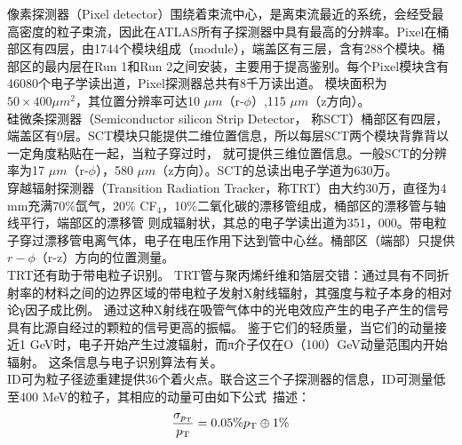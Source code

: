 像素探测器（Pixel detector）围绕着束流中心，是离束流最近的系统，会经受最高密度的粒子束流，因此在ATLAS所有子探测器中具有最高的分辨率。Pixel在桶部区有四层，由1744个模块组成（module），端盖区有三层，含有288个模块。桶部区的最内层在Run 1和Run 2之间安装，主要用于提高\bjet 鉴别。每个Pixel模块含有46080个电子学读出道，Pixel探测器总共有8千万读出道。
模块面积为$50\times400 \mu m^{2}$，其位置分辨率可达10 $\mu m$（r-$\phi$）,115 $\mu m$（z方向）。\\
硅微条探测器（Semiconductor silicon Strip Detector， 称SCT）桶部区有四层，端盖区有9层。SCT模块只能提供二维位置信息，所以每层SCT两个模块背靠背以一定角度粘贴在一起，当粒子穿过时，
就可提供三维位置信息。一般SCT的分辨率为17 $\mu m$（r-$\phi$），580 $\mu m$（z方向）。SCT的总读出电子学道为630万。\\
穿越辐射探测器（Transition Radiation Tracker，称TRT）由大约30万，直径为4 mm充满70\%氙气，20\% CF$_4$，10\%二氧化碳的漂移管组成，桶部区的漂移管与轴线平行，端部区的漂移管
则成辐射状，其总的电子学读出道为351，000。带电粒子穿过漂移管电离气体，电子在电压作用下达到管中心丝。桶部区（端部）只提供$r-\phi$（r-z）方向的位置测量。\\
TRT还有助于带电粒子识别。 TRT管与聚丙烯纤维和箔层交错：通过具有不同折射率的材料之间的边界区域的带电粒子发射X射线辐射，其强度与粒子本身的相对论γ因子成比例。 
通过这种X射线在吸管气体中的光电效应产生的电子产生的信号具有比源自经过的颗粒的信号更高的振幅。 
鉴于它们的轻质量，当它们的动量接近1 GeV时，电子开始产生过渡辐射，而π介子仅在O（100）GeV动量范围内开始辐射。 这条信息与电子识别算法有关。\\
ID可为粒子径迹重建提供36个着火点。联合这三个子探测器的信息，ID可测量\pt 低至400 MeV的粒子，其相应的动量可由如下公式~\cite{ATLAS_Collaboration_2008}描述：
\begin{equation}
 \frac{\sigma_{p_{\text{T}}}}{p_{\text{T}}}=0.05\%p_{\text{T}}\oplus1\%
\end{equation}

